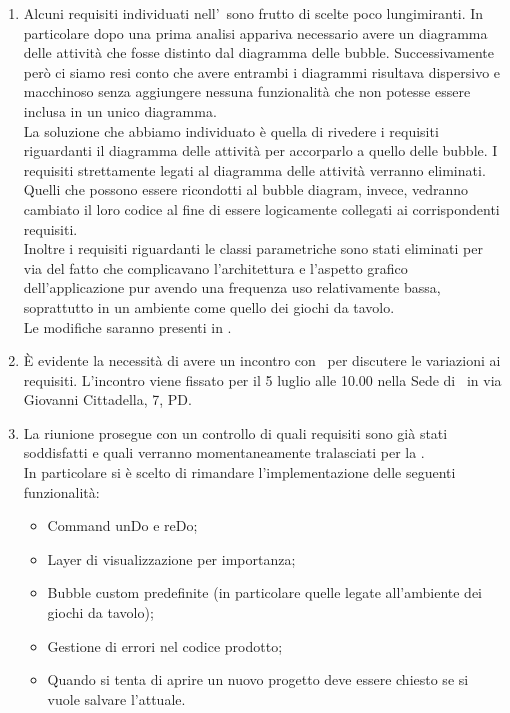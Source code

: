 \documentclass[../AnalisiDeiRequisiti.tex]{subfiles}
\begin{document}
		\begin{enumerate}
		\item Alcuni requisiti individuati nell'\analisideirequisiti\ sono frutto di scelte poco lungimiranti. In particolare dopo una prima analisi appariva necessario avere un diagramma delle attività che fosse distinto dal diagramma delle bubble. Successivamente però ci siamo resi conto che avere entrambi i diagrammi risultava dispersivo e macchinoso senza aggiungere nessuna funzionalità che non potesse essere inclusa in un unico diagramma. \\La soluzione che abbiamo individuato è quella di rivedere i requisiti riguardanti il diagramma delle attività per accorparlo a quello delle bubble. I requisiti strettamente legati al diagramma delle attività verranno eliminati. Quelli che possono essere ricondotti al bubble diagram, invece, vedranno cambiato il loro codice al fine di essere logicamente collegati ai corrispondenti requisiti.\\
		Inoltre i requisiti riguardanti le classi parametriche sono stati eliminati per via del fatto che complicavano l'architettura e l'aspetto grafico dell'applicazione pur avendo una frequenza uso relativamente bassa, soprattutto in un ambiente come quello dei giochi da tavolo.\\
		Le modifiche saranno presenti in \analisideirequisitiv.
		\item È evidente la necessità di avere un incontro con \proponente\ per discutere le variazioni ai requisiti. L'incontro viene fissato per il 5 luglio alle 10.00 nella Sede di \proponente\ in via Giovanni Cittadella, 7, PD.
		\item La riunione prosegue con un controllo di quali requisiti sono già stati soddisfatti e quali verranno momentaneamente tralasciati per la \revisionediqualifica.\\
		In particolare si è scelto di rimandare l'implementazione delle seguenti funzionalità:
		\begin{itemize}
			\item Command unDo e reDo;
			\item Layer di visualizzazione per importanza;
			\item Bubble custom predefinite (in particolare quelle legate all'ambiente dei giochi da tavolo);
			\item Gestione di errori nel codice prodotto;
			\item Quando si tenta di aprire un nuovo progetto deve essere chiesto se si vuole salvare l'attuale.
		\end{itemize}
		\end{enumerate}
\end{document}
